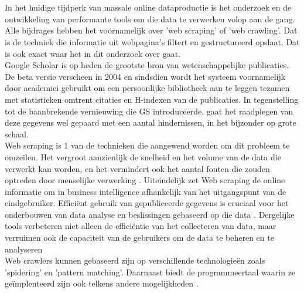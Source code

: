 \chapter{}%
\label{ch:stand-van-zaken}



In het huidige tijdperk van massale online dataproductie is het onderzoek en de ontwikkeling van performante tools om die data te verwerken volop aan de gang. Alle bijdrages hebben het voornamelijk over 'web scraping' of 'web crawling'. Dat is de techniek die informatie uit webpagina's filtert en gestructureerd opslaat. Dat is ook exact waar het in dit onderzoek over gaat.\\
Google Scholar is op heden de grootste bron van wetenschappelijke publicaties. De beta versie verscheen in 2004 en sindsdien wordt het systeem voornamelijk door academici gebruikt om een persoonlijke bibliotheek aan te leggen tezamen met statistieken omtrent citaties en H-indexen van de publicaties. In tegenstelling tot de baanbrekende vernieuwing die GS introduceerde, gaat het raadplegen van deze gegevens wel gepaard met een aantal hindernissen, in het bijzonder op grote schaal.\\
Web scraping is 1 van de technieken die aangewend worden om dit probleem te omzeilen. Het vergroot aanzienlijk de snelheid en het volume van de data die verwerkt kan worden, en het vermindert ook het aantal fouten die zouden optreden door menselijke verwerking \autocite{Bhatt2023}. Uiteindelijk zet Web scraping de online informatie om in business intelligence afhankelijk van het uitgangspunt van de eindgebruiker. Efficiënt gebruik van gepubliceerde gegevens is cruciaal voor het onderbouwen van data analyse en beslissingen gebaseerd op die data \autocite{NurDalila2023}. Dergelijke tools verbeteren niet alleen de efficiëntie van het collecteren van data, maar verruimen ook de capaciteit van de gebruikers om de data te beheren en te analyseren \textcite{Toth2024}\\
Web crawlers kunnen gebaseerd zijn op verschillende technologieën zoals 'spidering' en 'pattern matching'. Daarnaast biedt de programmeertaal waarin ze geïmplenteerd zijn ook telkens andere mogelijkheden \autocite{Bhatt2023}.
